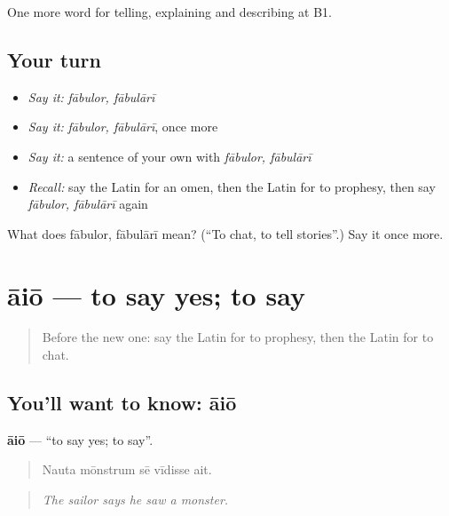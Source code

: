 \begin{grammarlens}[title={What you've built}]
One more word for telling, explaining and describing at B1.
\end{grammarlens}

\subsection*{Your turn}
\begin{itemize}
\raggedright
  \item \emph{Say it:} \emph{fābulor, fābulārī}
  \item \emph{Say it:} \emph{fābulor, fābulārī}, once more
  \item \emph{Say it:} a sentence of your own with \emph{fābulor, fābulārī}
  \item \emph{Recall:} say the Latin for an omen, then the Latin for to prophesy, then say \emph{fābulor, fābulārī} again
\end{itemize}

\begin{tcolorbox}[breakable,colback=teal!4,colframe=teal!35!black,title={Before you move on}]
What does fābulor, fābulārī mean? (\textquotedblleft{}To chat, to tell stories\textquotedblright{}.) Say it once more.
\end{tcolorbox}
\section[āiō]{āiō — to say yes; to say}

\label{lesson:LA-C349-aio}



\begin{quote}
Before the new one: say the Latin for to prophesy, then the Latin for to chat.
\end{quote}

\subsection*{You'll want to know: āiō}
\textbf{āiō} — \textquotedblleft{}to say yes; to say\textquotedblright{}.

\begin{quote}
Nauta mōnstrum sē vīdisse ait.
\end{quote}

\begin{quote}
\emph{The sailor says he saw a monster.}
\end{quote}

